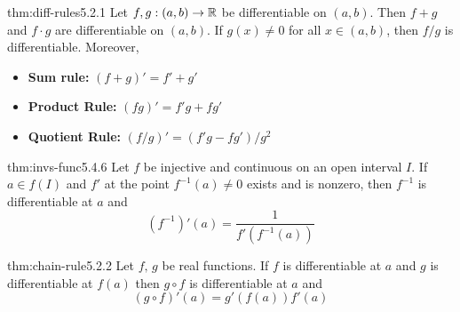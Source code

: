 \documentclass[landscape, 8pt]{extarticle}
\begin{document}
\begin{multicols}{3}
\begin{thm}{thm:diff-rules}{5.2.1}
    Let $f,g:(a,b)\to \mathbb{R}$ be differentiable on $(a,b)$. Then $f+g$ and $f\cdot g$ are differentiable on $(a,b)$. If $g(x)\ne 0$ for all $x \in (a,b)$, then $f/g$ is differentiable. Moreover,
    \vspace{-5pt}
    \renewcommand\labelitemi{\tiny$\bullet$}
    \begin{itemize}
        \setlength\itemsep{0em}
        \item \textbf{Sum rule:} $(f+g)' = f' + g'$
        \item \textbf{Product Rule:} $(fg)'=f'g + fg'$
        \item \textbf{Quotient Rule:} $\left(f / g\right)' =(f'g - fg') /g^{2}$
    \end{itemize}
\end{thm}
\vspace{-5pt}

\begin{thm}{thm:invs-func}{5.4.6}
    Let $f$ be injective and continuous on an open interval $I$. If $a\in f(I)$ and $f'$ at the point $f^{-1}(a)\ne 0$ exists and is nonzero, then $f^{-1}$ is differentiable at $a$ and
    \[(f^{-1})'(a)= \frac{1}{f'(f^{-1}(a))}\]
\end{thm}
\vspace{-5pt}



\begin{thm}{thm:chain-rule}{5.2.2}
    Let $f,\,g$ be real functions. If $f$ is differentiable at $a$ and $g$ is differentiable at $f(a)$ then $g\circ f$ is differentiable at $a$ and
    \[(g\circ f)'(a) = g'(f(a))f'(a)\]
\end{thm}
\vspace{-8pt}


\end{multicols}
\end{document}

